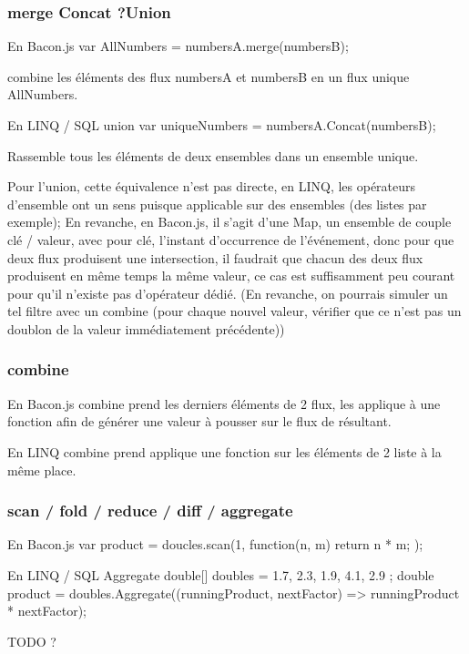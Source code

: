     \subsubsection{merge Concat ?Union }
      En Bacon.js
        var AllNumbers = numbersA.merge(numbersB);

        combine les éléments des flux numbersA et numbersB en un flux unique AllNumbers.

      En LINQ / SQL union
        var uniqueNumbers = numbersA.Concat(numbersB);

      Rassemble tous les éléments de deux ensembles dans un ensemble unique.

      Pour l'union, cette équivalence n'est pas directe, en LINQ, les opérateurs d'ensemble ont un sens puisque applicable sur des ensembles (des listes par exemple);
      En revanche, en Bacon.js, il s'agit d'une Map, un ensemble de couple clé / valeur, avec pour clé, l'instant d'occurrence de l'événement, donc pour que deux flux produisent une intersection, il faudrait que chacun des deux flux produisent en même temps la même valeur, ce cas est suffisamment peu courant pour qu'il n'existe pas d'opérateur dédié. (En revanche, on pourrais simuler un tel filtre avec un combine (pour chaque nouvel valeur, vérifier que ce n'est pas un doublon de la valeur immédiatement précédente))

    \subsubsection{combine}

      En Bacon.js combine prend les derniers éléments de 2 flux, les applique à une fonction afin de générer une valeur à pousser sur le flux de résultant.

      En LINQ combine prend applique une fonction sur les éléments de 2 liste à la même place.


    \subsubsection{scan / fold / reduce / diff / aggregate}
      En Bacon.js
        var product = doucles.scan(1, function(n, m) {
          return n * m;
        });

      En LINQ / SQL Aggregate
        double[] doubles = { 1.7, 2.3, 1.9, 4.1, 2.9 };
        double product = doubles.Aggregate((runningProduct, nextFactor) => runningProduct * nextFactor); 

       TODO ? 

